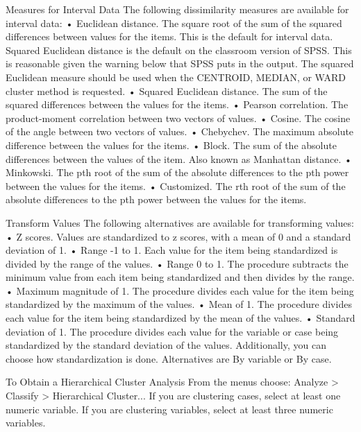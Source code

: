  
Measures for Interval Data
The following dissimilarity measures are available for interval data:
•	Euclidean distance. The square root of the sum of the squared differences between values for the items. This is the default for interval data. {Squared Euclidean distance is the default on the classroom version of SPSS.  This is reasonable given the warning below that SPSS puts in the output.} 
The squared Euclidean measure should be used when the CENTROID, MEDIAN, or WARD cluster method is requested.
•	Squared Euclidean distance. The sum of the squared differences between the values for the items. 
•	Pearson correlation. The product-moment correlation between two vectors of values. 
•	Cosine. The cosine of the angle between two vectors of values. 
•	Chebychev. The maximum absolute difference between the values for the items. 
•	Block. The sum of the absolute differences between the values of the item. Also known as Manhattan distance. 
•	Minkowski. The pth root of the sum of the absolute differences to the pth power between the values for the items. 
•	Customized. The rth root of the sum of the absolute differences to the pth power between the values for the items.

Transform Values
The following alternatives are available for transforming values:
•	Z scores. Values are standardized to z scores, with a mean of 0 and a standard deviation of 1. 
•	Range -1 to 1. Each value for the item being standardized is divided by the range of the values. 
•	Range 0 to 1. The procedure subtracts the minimum value from each item being standardized and then divides by the range. 
•	Maximum magnitude of 1. The procedure divides each value for the item being standardized by the maximum of the values. 
•	Mean of 1. The procedure divides each value for the item being standardized by the mean of the values. 
•	Standard deviation of 1. The procedure divides each value for the variable or case being standardized by the standard deviation of the values.
Additionally, you can choose how standardization is done. Alternatives are By variable or By case.

To Obtain a Hierarchical Cluster Analysis
From the menus choose:
Analyze  >  Classify  >  Hierarchical Cluster...
If you are clustering cases, select at least one numeric variable. If you are clustering variables, select at least three numeric variables. 


